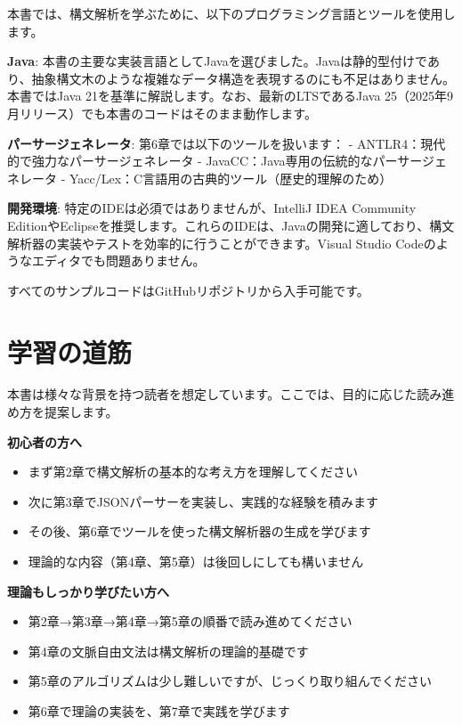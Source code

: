 本書では、構文解析を学ぶために、以下のプログラミング言語とツールを使用します。

\textbf{Java}:
本書の主要な実装言語としてJavaを選びました。Javaは静的型付けであり、抽象構文木のような複雑なデータ構造を表現するのにも不足はありません。本書ではJava
21を基準に解説します。なお、最新のLTSであるJava
25（2025年9月リリース）でも本書のコードはそのまま動作します。

\textbf{パーサージェネレータ}: 第6章では以下のツールを扱います： -
ANTLR4：現代的で強力なパーサージェネレータ -
JavaCC：Java専用の伝統的なパーサージェネレータ -
Yacc/Lex：C言語用の古典的ツール（歴史的理解のため）

\textbf{開発環境}: 特定のIDEは必須ではありませんが、IntelliJ IDEA
Community
EditionやEclipseを推奨します。これらのIDEは、Javaの開発に適しており、構文解析器の実装やテストを効率的に行うことができます。Visual
Studio Codeのようなエディタでも問題ありません。

すべてのサンプルコードはGitHubリポジトリから入手可能です。

\hypertarget{chapter1-ux5b66ux7fd2ux306eux9053ux7b4b}{%
\section{学習の道筋}\label{chapter1-ux5b66ux7fd2ux306eux9053ux7b4b}}

本書は様々な背景を持つ読者を想定しています。ここでは、目的に応じた読み進め方を提案します。

\textbf{初心者の方へ}

\begin{itemize}
\tightlist
\item
  まず第2章で構文解析の基本的な考え方を理解してください
\item
  次に第3章でJSONパーサーを実装し、実践的な経験を積みます
\item
  その後、第6章でツールを使った構文解析器の生成を学びます
\item
  理論的な内容（第4章、第5章）は後回しにしても構いません
\end{itemize}

\textbf{理論もしっかり学びたい方へ}

\begin{itemize}
\tightlist
\item
  第2章→第3章→第4章→第5章の順番で読み進めてください
\item
  第4章の文脈自由文法は構文解析の理論的基礎です
\item
  第5章のアルゴリズムは少し難しいですが、じっくり取り組んでください
\item
  第6章で理論の実装を、第7章で実践を学びます
\end{itemize}


